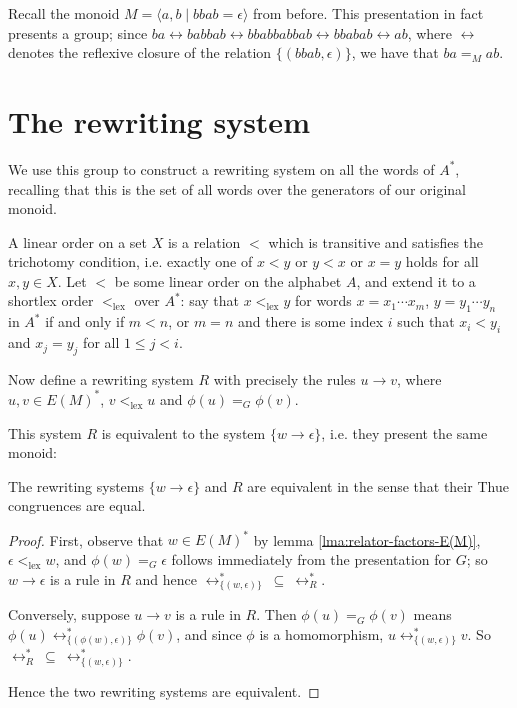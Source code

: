 \documentclass[11pt,libertine,widepage,nosubthm]{lmaths}
\newcommand{\ltlex}{<_{\mathrm{lex}}}
\begin{document}
\begin{example}
	Recall the monoid $M = \langle a, b \mid bbab = \epsilon \rangle$ from before. This presentation in fact presents a group; since $ba \leftrightarrow babbab \leftrightarrow bbabbabbab \leftrightarrow bbabab \leftrightarrow ab$, where $\leftrightarrow$ denotes the reflexive closure of the relation $\{(bbab, \epsilon)\}$, we have that $ba =_M ab$.
\end{example}

\section{The rewriting system}
We use this group to construct a rewriting system on all the words of $A^*$, recalling that this is the set of all words over the generators of our original monoid.

A linear order on a set $X$ is a relation $<$ which is transitive and satisfies the trichotomy condition, i.e. exactly one of $x < y$ or $y < x$ or $x = y$ holds for all $x, y \in X$. Let $<$ be some linear order on the alphabet $A$, and extend it to a shortlex order $\ltlex$ over $A^*$: say that $x \ltlex y$ for words $x = x_1\cdots x_m$, $y = y_1\cdots y_n$ in $A^*$ if and only if $m < n$, or $m = n$ and there is some index $i$ such that $x_i < y_i$ and $x_j = y_j$ for all $1 \le j < i$.

Now define a rewriting system $R$ with precisely the rules $u \to v$, where $u, v \in E(M)^*$, $v \ltlex u$ and $\phi(u) =_G \phi(v)$.

This system $R$ is equivalent to the system $\{w \to \epsilon\}$, i.e. they present the same monoid:

\begin{lemma} \label{lma:R-equivalent-to-pres}
	The rewriting systems $\{w \to \epsilon\}$ and $R$ are equivalent in the sense that their Thue congruences are equal.
\end{lemma}
\begin{proof}
First, observe that $w \in E(M)^*$ by lemma \ref{lma:relator-factors-E(M)}, $\epsilon \ltlex w$, and $\phi(w) =_G \epsilon$ follows immediately from the presentation for $G$; so $w \to \epsilon$ is a rule in $R$ and hence $\leftrightarrow^*_{\{(w,\epsilon)\}}\ \subseteq\ \leftrightarrow^*_R$.

Conversely, suppose $u \to v$ is a rule in $R$. Then $\phi(u) =_G \phi(v)$ means $\phi(u) \leftrightarrow^*_{\{(\phi(w), \epsilon)\}} \phi(v)$, and since $\phi$ is a homomorphism, $u \leftrightarrow^*_{\{(w, \epsilon)\}} v$. So $\leftrightarrow^*_R\ \subseteq\ \leftrightarrow^*_{\{(w,\epsilon)\}}$.

Hence the two rewriting systems are equivalent.
\end{proof}
\end{document}
